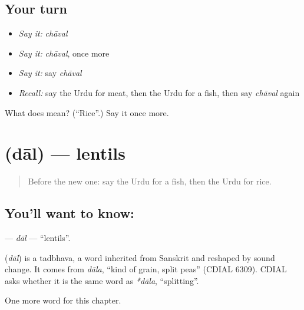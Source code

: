 \subsection*{Your turn}
\begin{itemize}
\raggedright
  \item \emph{Say it:} \emph{chāval}
  \item \emph{Say it:} \emph{chāval}, once more
  \item \emph{Say it:} say \emph{chāval}
  \item \emph{Recall:} say the Urdu for meat, then the Urdu for a fish, then say \emph{chāval} again
\end{itemize}

\begin{tcolorbox}[breakable,colback=teal!4,colframe=teal!35!black,title={Before you move on}]
What does  mean? (\textquotedblleft{}Rice\textquotedblright{}.) Say it once more.
\end{tcolorbox}
\section[\texorpdfstring{\ur{دال} (dāl)}{دال (dāl)}]{ (dāl) — lentils}

\label{lesson:UR-C54-dal}



\begin{quote}
Before the new one: say the Urdu for a fish, then the Urdu for rice.
\end{quote}

\subsection*{You'll want to know: }
\textbf{} — \emph{dāl} — \textquotedblleft{}lentils\textquotedblright{}.

\begin{cousinweb}
\textbf{} (\emph{dāl}) is a tadbhava, a word inherited from Sanskrit and reshaped by sound change. It comes from \emph{dāla}, \textquotedblleft{}kind of grain, split peas\textquotedblright{} (CDIAL 6309). CDIAL asks whether it is the same word as \emph{*dāla}, \textquotedblleft{}splitting\textquotedblright{}.
\end{cousinweb}

\begin{grammarlens}[title={What you've built}]
One more word for this chapter.
\end{grammarlens}

